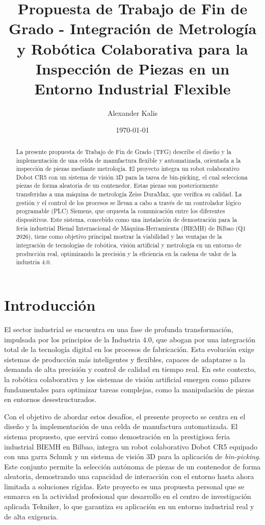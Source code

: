 \documentclass[12pt, a4paper]{article}
\title{Propuesta de Trabajo de Fin de Grado - Integración de Metrología y Robótica Colaborativa para la Inspección de Piezas en un Entorno Industrial Flexible}
\author{Alexander Kalis} %
\date{\today}
\begin{document}
\maketitle
\thispagestyle{empty}
\newpage 

\begin{abstract}
La presente propuesta de Trabajo de Fin de Grado (TFG) describe el diseño y la implementación de una celda de manufactura flexible y automatizada,
orientada a la inspección de piezas mediante metrología. El proyecto integra un robot colaborativo Dobot CR5 con un sistema de visión 
3D para la tarea de bin-picking, el cual selecciona piezas de forma aleatoria de un contenedor. Estas piezas son posteriormente
transferidas a una máquina de metrología Zeiss DuraMax, que verifica su calidad. La gestión y el control de los procesos se llevan
a cabo a través de un controlador lógico programable (PLC) Siemens, que orquesta la comunicación entre los diferentes dispositivos. 
Este sistema, concebido como una instalación de demostración para la feria industrial Bienal Internacional de Máquina-Herramienta (BIEMH) de Bilbao (Q1 2026), tiene como objetivo principal 
mostrar la viabilidad y las ventajas de la integración de tecnologías de robótica, visión artificial y metrología en un entorno de
producción real, optimizando la precisión y la eficiencia en la cadena de valor de la industria 4.0.
\end{abstract}

\newpage
\tableofcontents
\newpage
\section{Introducción}
El sector industrial se encuentra en una fase de profunda transformación, impulsada por los principios de la Industria 4.0, que abogan por una integración total de la tecnología digital en los procesos de fabricación. Esta evolución exige sistemas de producción más inteligentes y flexibles, capaces de adaptarse a la demanda de alta precisión y control de calidad en tiempo real. En este contexto, la robótica colaborativa y los sistemas de visión artificial emergen como pilares fundamentales para optimizar tareas complejas, como la manipulación de piezas en entornos desestructurados.

Con el objetivo de abordar estos desafíos, el presente proyecto se centra en el diseño y la implementación de una celda de manufactura automatizada. El sistema propuesto, que servirá como demostración en la prestigiosa feria industrial BIEMH en Bilbao, integra un robot colaborativo Dobot CR5 equipado con una garra Schunk y un sistema de visión 3D para la aplicación de \textit{bin-picking}. Este conjunto permite la selección autónoma de piezas de un contenedor de forma aleatoria, demostrando una capacidad de interacción con el entorno hasta ahora limitada a soluciones rígidas. Este proyecto es una propuesta personal que se enmarca en la actividad profesional que desarrollo en el centro de investigación aplicada Tekniker, lo que garantiza su aplicación en un entorno industrial real y de alta exigencia.
\end{document}
